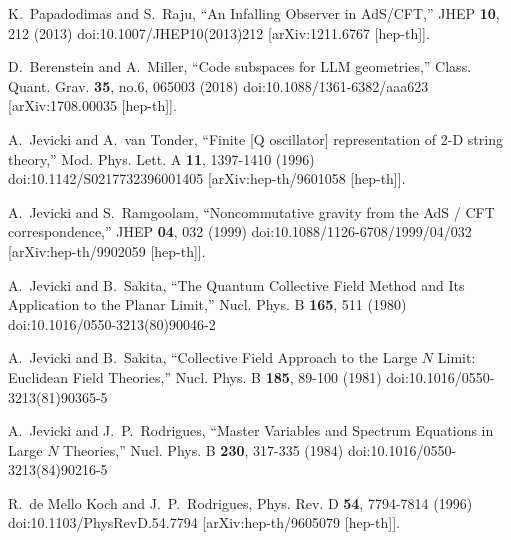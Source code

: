 \documentclass[a4paper,12pt]{article}
\begin{document}
\begin{thebibliography}{}
K.~Papadodimas and S.~Raju,
``An Infalling Observer in AdS/CFT,''
JHEP \textbf{10}, 212 (2013)
doi:10.1007/JHEP10(2013)212
[arXiv:1211.6767 [hep-th]].

D.~Berenstein and A.~Miller,
``Code subspaces for LLM geometries,''
Class. Quant. Grav. \textbf{35}, no.6, 065003 (2018)
doi:10.1088/1361-6382/aaa623
[arXiv:1708.00035 [hep-th]].

A.~Jevicki and A.~van Tonder,
``Finite [Q oscillator] representation of 2-D string theory,''
Mod. Phys. Lett. A \textbf{11}, 1397-1410 (1996)
doi:10.1142/S0217732396001405
[arXiv:hep-th/9601058 [hep-th]].

A.~Jevicki and S.~Ramgoolam,
``Noncommutative gravity from the AdS / CFT correspondence,''
JHEP \textbf{04}, 032 (1999)
doi:10.1088/1126-6708/1999/04/032
[arXiv:hep-th/9902059 [hep-th]].

A.~Jevicki and B.~Sakita,
``The Quantum Collective Field Method and Its Application to the Planar Limit,''
Nucl. Phys. B \textbf{165}, 511 (1980)
doi:10.1016/0550-3213(80)90046-2

A.~Jevicki and B.~Sakita,
``Collective Field Approach to the Large $N$ Limit: Euclidean Field Theories,''
Nucl. Phys. B \textbf{185}, 89-100 (1981)
doi:10.1016/0550-3213(81)90365-5

A.~Jevicki and J.~P.~Rodrigues,
``Master Variables and Spectrum Equations in Large $N$ Theories,''
Nucl. Phys. B \textbf{230}, 317-335 (1984)
doi:10.1016/0550-3213(84)90216-5

R.~de Mello Koch and J.~P.~Rodrigues,
Phys. Rev. D \textbf{54}, 7794-7814 (1996)
doi:10.1103/PhysRevD.54.7794
[arXiv:hep-th/9605079 [hep-th]].


\end{thebibliography}
\end{document}
